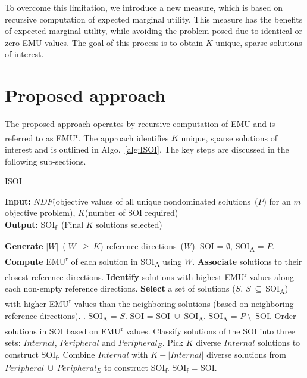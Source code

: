 To overcome this limitation, we introduce a new measure, which is based on recursive computation of expected marginal utility. This measure has the benefits of expected marginal utility, while avoiding the problem posed due to identical or zero EMU values. The goal of this process is to obtain $K$ unique, sparse solutions of interest.

\section{Proposed approach}
\label{sec:propmetric}

The proposed approach operates by recursive computation of EMU and is referred to as EMU\textsuperscript{r}. The approach identifies $K$ unique, sparse solutions of interest and is outlined in Algo.~\ref{alg:ISOI}. The key steps are discussed in the following sub-sections.

\begin{algorithm}[!ht]\footnotesize
	\caption{ISOI}
	\show\LOOP
	\textbf{Input:} $NDF$\hspace{1mm}(objective values of all unique nondominated solutions~($P$) for an $m$ objective problem), $K$\hspace{1mm}(number of SOI required)\\
	\textbf{Output:} SOI\textsubscript{f}~(Final $K$ solutions selected)
	\begin{algorithmic}[1]
		\STATE \textbf{Generate} $|W|$~($|W|~\ge~K$) reference directions~($W$).
		\STATE SOI = $\emptyset$, SOI\textsubscript{A} = $P$.
		\STATE \textbf{Compute} EMU\textsuperscript{r} of each solution in SOI\textsubscript{A} using $W$.
		\STATE \textbf{Associate} solutions to their closest reference directions. 
		\STATE \textbf{Identify} solutions with highest EMU\textsuperscript{r} values along each non-empty reference directions. 
		\STATE \textbf{Select} a set of solutions ($S$, $S~\subseteq~$SOI\textsubscript{A}) with higher EMU\textsuperscript{r} values than the neighboring solutions (based on neighboring reference directions).
		\BREAK.
		\ELSE
		\STATE SOI\textsubscript{A} = $S$.
		\ENDIF
		\ENDWHILE
		\STATE SOI = SOI~$\cup$~SOI\textsubscript{A}.
		\STATE SOI\textsubscript{A} = $P~\setminus$~SOI.
		\ENDWHILE
		\STATE Order solutions in SOI based on EMU\textsuperscript{r} values.
		\STATE Classify solutions of the SOI into three sets: $Internal$, $Peripheral$ and $Peripheral_E$.
		\STATE Pick $K$ diverse $Internal$ solutions to construct SOI\textsubscript{f}.
		\STATE Combine $Internal$ with $K - |Internal|$ diverse solutions from $Peripheral~\cup~Peripheral_E$ to construct SOI\textsubscript{f}.
		\ENDIF
		\STATE SOI\textsubscript{f} = SOI.
		\ENDIF
	\end{algorithmic}
	\label{alg:ISOI}
\end{algorithm} 

